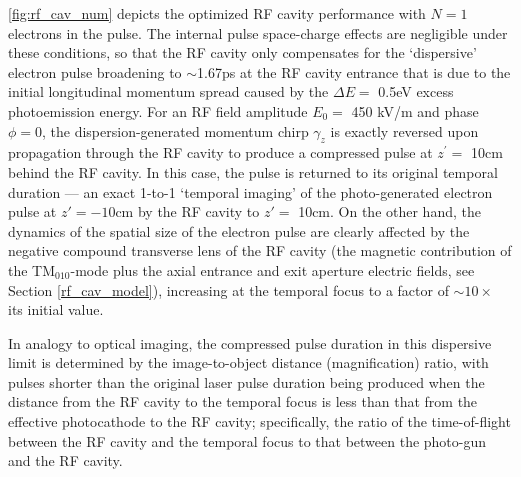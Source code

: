 \ref{fig:rf_cav_num} depicts the optimized RF cavity performance with $N=1$ electrons in the pulse.
The internal pulse space-charge effects are negligible under these conditions, so that the RF cavity only compensates for the `dispersive' electron pulse broadening to $\sim$1.67ps at the RF cavity entrance that is due to the initial longitudinal momentum spread caused by the $\Delta E = $ 0.5eV excess photoemission energy.
For an RF field amplitude $E_{0} = $ 450 kV/m and phase $\phi = 0$, the dispersion-generated momentum chirp $\gamma_{z}$ is exactly reversed upon propagation through the RF cavity to produce a compressed pulse at $ z^{\prime} = $ 10cm behind the RF cavity.
In this case, the pulse is returned to its original temporal duration --- an exact 1-to-1 `temporal imaging' of the photo-generated electron pulse at $z' = -10$cm by the RF cavity to $ z' = $ 10cm.
On the other hand, the dynamics of the spatial size of the electron pulse are clearly affected by the negative compound transverse lens of the RF cavity (the magnetic contribution of the TM$_{010}$-mode plus the axial entrance and exit aperture electric fields, see Section \ref{rf_cav_model}), increasing at the temporal focus to a factor of $\sim 10\times$ its initial value.

In analogy to optical imaging, the compressed pulse duration in this dispersive limit is determined by the image-to-object distance (magnification) ratio, with pulses shorter than the original laser pulse duration being produced when the distance from the RF cavity to the temporal focus is less than that from the effective photocathode to the RF cavity; specifically, the ratio of the time-of-flight between the RF cavity and the temporal focus to that between the photo-gun and the RF cavity.

